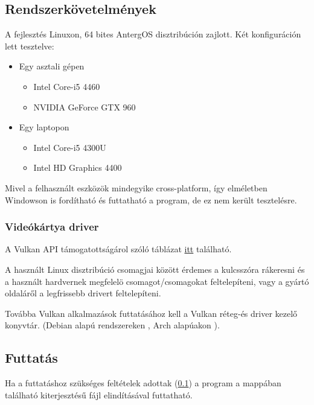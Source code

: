 \subsection{Rendszerk\"ovetelm\'enyek}\label{runrequirements}
A fejleszt\'es Linuxon, 64 bites AntergOS disztrib\'uci\'on zajlott. 
\newline
K\'et konfigur\'aci\'on lett tesztelve:
\begin{itemize}
	\item Egy asztali g\'epen
		\begin{itemize}
			\item Intel Core-i5 4460
			\item NVIDIA GeForce GTX 960
		\end{itemize}
	\item Egy laptopon
		\begin{itemize}
			\item Intel Core-i5 4300U
			\item Intel HD Graphics 4400
		\end{itemize}
\end{itemize}

Mivel a felhaszn\'alt eszk\"oz\"ok mindegyike cross-platform, \'igy elm\'eletben Windowson is ford\'ithat\'o \'es futtathat\'o a program, de ez nem ker\"ult tesztel\'esre.

\subsubsection{Vide\'ok\'artya driver}\label{gpudriver}
A Vulkan API t\'amogatotts\'ag\'arol sz\'ol\'o t\'abl\'azat \href{https://en.wikipedia.org/wiki/Vulkan_(API)\#Compatibility}{itt} tal\'alhat\'o.

A haszn\'alt Linux disztrib\'uci\'o csomagjai k\"oz\"ott \'erdemes a  kulcssz\'ora r\'akeresni \'es a haszn\'alt hardvernek megfelel\"o csomagot/csomagokat feltelep\'iteni, vagy a gy\'art\'o oldal\'ar\H ol a legfrissebb drivert feltelep\'iteni.

Tov\'abba Vulkan alkalmaz\'asok futtat\'as\'ahoz kell a Vulkan r\'eteg-\'es driver kezel\H o konyvt\'ar. (Debian alap\'u rendszereken , Arch alap\'uakon ).

\subsection{Futtat\'as}
Ha a futtat\'ashoz sz\"uks\'eges felt\'etelek adottak (\ref{runrequirements}) a program a  mapp\'aban tal\'alhat\'o  kiterjeszt\'es\H u f\'ajl elind\'it\'as\'aval futtathat\'o. 